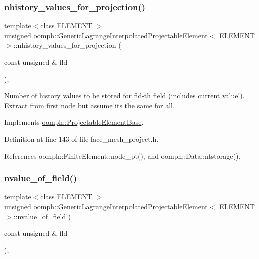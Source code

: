 \subsubsection{\texorpdfstring{nhistory\+\_\+values\+\_\+for\+\_\+projection()}{nhistory\_values\_for\_projection()}}
{\footnotesize\ttfamily template$<$class E\+L\+E\+M\+E\+NT $>$ \\
unsigned \hyperlink{classoomph_1_1GenericLagrangeInterpolatedProjectableElement}{oomph\+::\+Generic\+Lagrange\+Interpolated\+Projectable\+Element}$<$ E\+L\+E\+M\+E\+NT $>$\+::nhistory\+\_\+values\+\_\+for\+\_\+projection (\begin{DoxyParamCaption}\item[{const unsigned \&}]{fld }\end{DoxyParamCaption})\hspace{0.3cm}{\ttfamily [inline]}, {\ttfamily [virtual]}}



Number of history values to be stored for fld-\/th field (includes current value!). Extract from first node but assume it\textquotesingle{}s the same for all. 



Implements \hyperlink{classoomph_1_1ProjectableElementBase_ac6790f394630b964663281f8740f43a5}{oomph\+::\+Projectable\+Element\+Base}.



Definition at line 143 of file face\+\_\+mesh\+\_\+project.\+h.



References oomph\+::\+Finite\+Element\+::node\+\_\+pt(), and oomph\+::\+Data\+::ntstorage().

\mbox{\label{classoomph_1_1GenericLagrangeInterpolatedProjectableElement_ab2dddff594eedd24a1db29b17ab8868b}} 
\subsubsection{\texorpdfstring{nvalue\+\_\+of\+\_\+field()}{nvalue\_of\_field()}}
{\footnotesize\ttfamily template$<$class E\+L\+E\+M\+E\+NT $>$ \\
unsigned \hyperlink{classoomph_1_1GenericLagrangeInterpolatedProjectableElement}{oomph\+::\+Generic\+Lagrange\+Interpolated\+Projectable\+Element}$<$ E\+L\+E\+M\+E\+NT $>$\+::nvalue\+\_\+of\+\_\+field (\begin{DoxyParamCaption}\item[{const unsigned \&}]{fld }\end{DoxyParamCaption})\hspace{0.3cm}{\ttfamily [inline]}, {\ttfamily [virtual]}}



